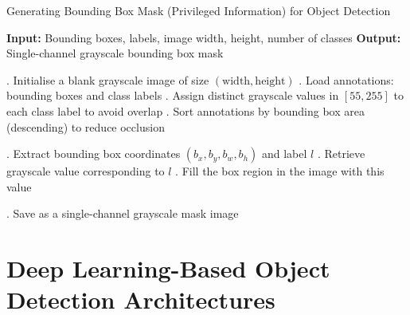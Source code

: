         
\begin{algorithm}
    \caption{Generating Bounding Box Mask (Privileged Information) for Object Detection}
    \label{alg:boundingBoxMask}
    \begin{algorithmic}
        \State \textbf{Input:} Bounding boxes, labels, image width, height, number of classes
        \State \textbf{Output:} Single-channel grayscale bounding box mask
        
        . Initialise a blank grayscale image of size \( (\text{width}, \text{height}) \)
        . Load annotations: bounding boxes and class labels
        . Assign distinct grayscale values in $[55, 255]$ to each class label to avoid overlap
        . Sort annotations by bounding box area (descending) to reduce occlusion
        
            . Extract bounding box coordinates \( (b_x, b_y, b_w, b_h) \) and label \( l \)
            . Retrieve grayscale value corresponding to \( l \)
            . Fill the box region in the image with this value
        \EndFor
        
        . Save as a single-channel grayscale mask image
    \end{algorithmic}
\end{algorithm}


\section{Deep Learning-Based Object Detection Architectures}
\label{sec:4_distillation_architectures}

